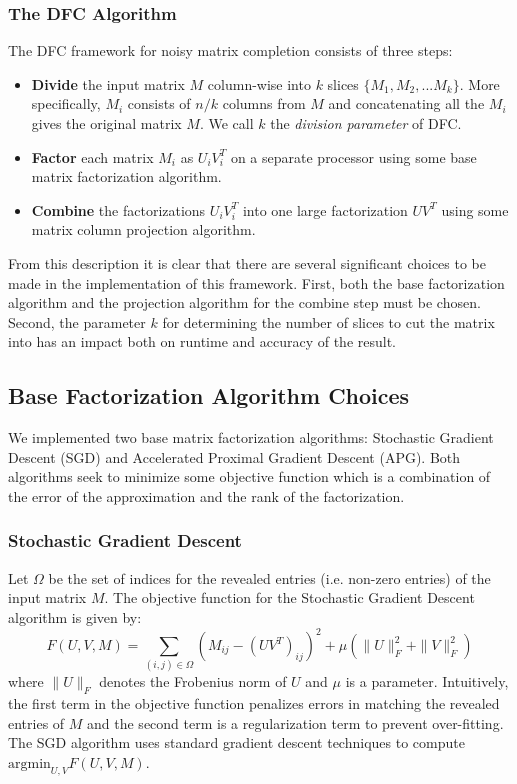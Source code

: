 \subsubsection{The DFC Algorithm}
The DFC framework for noisy matrix completion consists of three steps:
\begin{itemize}
\item \textbf{Divide} the input matrix $M$ column-wise into $k$ 
slices $\{M_1,M_2,...M_k\}$. More specifically, $M_i$ 
consists of $n/k$ columns from $M$ and concatenating all 
the $M_i$ gives the original matrix $M$. We call $k$ 
the \emph{division parameter} of DFC.
\item \textbf{Factor} each matrix $M_i$ as $U_i V_i^T$ on a separate 
processor using some base matrix factorization algorithm.
\item \textbf{Combine} the factorizations $U_iV_i^T$ into one large 
factorization $UV^T$ using some matrix column projection algorithm.
\end{itemize}
From this description it is clear that there are several significant 
choices to be made in the implementation of this framework. First, 
both the base factorization algorithm and the projection algorithm 
for the combine step must be chosen. Second, the parameter $k$ for 
determining the number of slices to cut the matrix into has an 
impact both on runtime and accuracy of the result.

\subsection{Base Factorization Algorithm Choices}
We implemented two base matrix factorization algorithms: 
Stochastic Gradient Descent (SGD) and Accelerated Proximal Gradient 
Descent (APG). Both algorithms seek to minimize some objective 
function which is a combination of the error of the approximation 
and the rank of the factorization.

\subsubsection{Stochastic Gradient Descent}
Let $\Omega$ be the set of indices for the revealed entries 
(i.e. non-zero entries) of the input matrix $M$. The objective 
function for the Stochastic Gradient Descent algorithm is given by:
\[
F(U,V,M) = \sum_{(i,j)\in \Omega} \left(M_{ij} - (UV^T)_{ij}\right)^2 + \mu (\| U\|^2_F  + \| V\|^2_F)
\]
where $\|U\|_F$ denotes the Frobenius norm of $U$ and $\mu$ is a parameter.
Intuitively, the first term in the objective function penalizes 
errors in matching the revealed entries of $M$ and the second term 
is a regularization term to prevent over-fitting. The SGD algorithm 
uses standard gradient descent techniques to compute 
$\mbox{argmin}_{U,V} F(U,V,M)$. 

